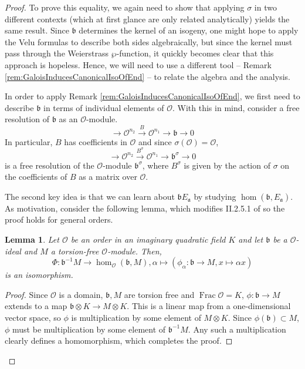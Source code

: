 \documentclass{amsart}
\newtheorem{lem}[thm]{Lemma}
\theoremstyle{definition}
\theoremstyle{remark}
\numberwithin{equation}{section}
\newcommand{\cO}{\mathcal O}
\newcommand{\fka}{\mathfrak a}
\newcommand{\fkb}{\mathfrak b}
\newcommand{\inv}{^{-1}}
\DeclareMathOperator{\Frac}{Frac}
\begin{document}
 \begin{proof}
 To prove this equality, we again need to show that applying $\sigma$ in two different contexts (which at first glance are only related analytically) yields the same result. Since $\fkb$ determines the kernel of an isogeny, one might hope to apply the Velu formulas to describe both sides algebraically, but since the kernel must pass through the Weierstrass $\wp$-function, it quickly becomes clear that this approach is hopeless. Hence, we will need to use a different tool -- Remark \ref{rem:GaloisInducesCanonicalIsoOfEnd} -- to relate the algebra and the analysis.

 In order to apply Remark \ref{rem:GaloisInducesCanonicalIsoOfEnd}, we first need to describe $\fkb$ in terms of individual elements of $\cO$. With this in mind, consider a free resolution of $\fkb$ as an $\cO$-module. 
 \[
 \to \cO^{n_{2}} \overset{B}{\to} \cO^{n_{1}} \to \fkb \to 0
 \]
 In particular, $B$ has coefficients in $\cO$ and since $\sigma(\cO) = \cO$, 
 \[
 \to \cO^{n_{2}} \overset{B^{\sigma}}{\to} \cO^{n_{1}} \to \fkb^{\sigma} \to 0
 \]
 is a free resolution of the $\cO$-module $\fkb^{\sigma}$, where $B^{\sigma}$ is given by the action of $\sigma$ on the coefficients of $B$ as a matrix over $\cO$.
 
 
 
 The second key idea is that we can learn about $\fkb E_{\fka}$ by studying $\hom(\fkb, E_{\fka})$. As motivation, consider the following lemma, which modifies II.2.5.1 of \cite{SilvermanATAEC} so the proof holds for general orders.
 
 \begin{lem} \label{lem:HomsBetweenTorsionFree}
 Let $\cO$ be an order in an imaginary quadratic field $K$ and let $\fkb$ be a $\cO$-ideal and $M$ a torsion-free $\cO$-module. Then,
 \[
 \Phi: \fkb\inv M \to \hom_{\cO}(\fkb, M), \alpha \mapsto (\phi_{\alpha}: \fkb \to M, x \mapsto \alpha x)
 \]
 is an isomorphism.
 \end{lem} 
 
 \begin{proof}
 Since $\cO$ is a domain, $\fkb, M$ are torsion free and $\Frac{\cO} = K$, $\phi: \fkb \to M$ extends to a map $\fkb \otimes K \to M \otimes K$. This is a linear map from a one-dimensional vector space, so $\phi$ is multiplication by some element of $M \otimes K$. Since $\phi(\fkb) \subset M$, $\phi$ must be multiplication by some element of $\fkb\inv M$. Any such a multiplication clearly defines a homomorphism, which completes the proof.
 \end{proof}
 

\end{proof}
\end{document}
